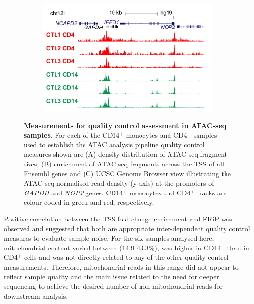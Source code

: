 \begin{figure}[htbp]
\begin{subfigure}[b]{0.6\textwidth}
\centering
\includegraphics[width=\textwidth]{./Results1/pdfs/ATAC_Core_CD4_CD14_fresh_GAPDH}
\caption{\textbf{}} %
\end{subfigure}
\caption[Measurements for quality control assessment in ATAC-seq samples]{\textbf{Measurements for quality control assessment in ATAC-seq samples.} For each of the CD14$^+$ monocytes and CD4$^+$ samples used to establish the ATAC analysis pipeline quality control measures shown are (A) density distribution of ATAC-seq fragment sizes, (B) enrichment of ATAC-seq fragments across the TSS of all Ensembl genes and (C) UCSC Genome Browser view illustrating the ATAC-seq normalised read density (y-axis) at the promoters of \textit{GAPDH} and \textit{NOP2} genes. CD14$^+$ monocytes and CD4$^+$ tracks are colour-coded in green and red, respectively.}
\label{figure:QC_ATAC}
\end{figure} 

Positive correlation between the TSS fold-change enrichment and FRiP was observed and suggested that both are appropriate inter-dependent quality control measures to evaluate sample noise. For the six samples analysed here, mitochondrial content varied between (14.9-43.3\%), was higher in CD14$^+$ than in CD4$^+$ cells and was not directly related to any of the other quality control measurements. Therefore, mitochondrial reads in this range did not appear to reflect sample quality and the main issue related to the need for deeper sequencing to achieve the desired number of non-mitochondrial reads for downstream analysis.

 

